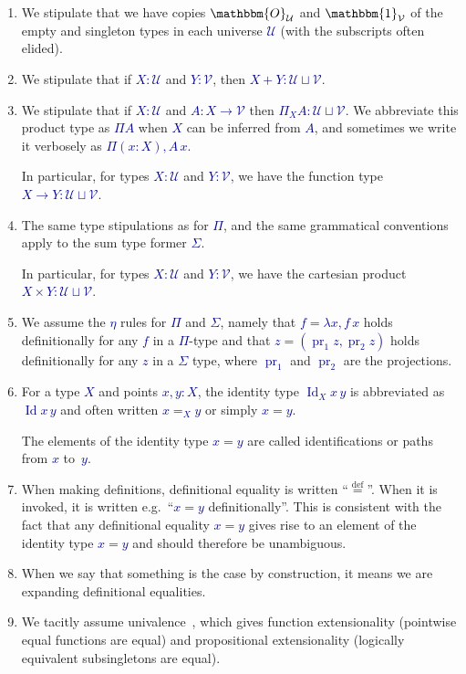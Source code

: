 \documentclass[10pt]{article}
\newcommand{\db}{\textcolor{darkblue}}
\newcommand{\m}[1]{\db{$#1$}}
\newcommand{\fst}{\operatorname{pr}_1}
\newcommand{\snd}{\operatorname{pr}_2}
\newcommand{\U}{\mathcal{U}}
\newcommand{\V}{\mathcal{V}}
\newcommand{\Zero}{\mathbbm{O}}
\newcommand{\One}{\mathbbm{1}}
\newcommand{\Id}{\operatorname{Id}}
\newcommand{\eqdef}{\overset{\text{def}}{=}}
\newcommand{\idto}{=}
\theoremstyle{definition}
\begin{document}
\begin{enumerate}
\item We stipulate that we have copies \m{\Zero_\U} and \m{\One_\V} of the
  empty and singleton types in each universe \m{\U} (with the subscripts
  often elided).
\item We stipulate that if \m{X : \U} and \m{Y : \V}, then \m{X+Y : \U \sqcup \V}.
\item We stipulate that if \m{X : \U} and \m{A : X \to \V} then
  \m{\Pi_X A : \U \sqcup \V}. We abbreviate this product type as \m{\Pi A}
  when \m{X} can be inferred from \m{A}, and sometimes we write it
  verbosely as \m{\Pi (x:X), A \, x}.

  In particular, for types \m{X : \U} and \m{Y : \V}, we have the function
  type \m{X \to Y : \U \sqcup \V}.
\item The same type stipulations as for \m{\Pi}, and the same
  grammatical conventions apply to the sum type former \m{\Sigma}.

  In particular, for types \m{X : \U} and \m{Y : \V}, we have the cartesian product \m{X \times Y : \U \sqcup \V}.

\item We assume the \m{\eta} rules for \m{\Pi} and \m{\Sigma}, namely
  that \m{f = \lambda x, f \, x} holds definitionally for any \m{f} in
  a \m{\Pi}-type and that \m{z=(\fst z , \snd z)} holds definitionally
  for any \m{z} in a \m{\Sigma} type, where \m{\fst} and \m{\snd} are
  the projections.

\item For a type \m{X} and points \m{x,y:X}, the identity type \m{\Id_{X} x \, y} is abbreviated as \m{\Id x \, y} and often written \m{x \idto_X y} or simply \m{x \idto y}.

  The elements of the identity type \m{x=y} are called identifications
  or paths from \m{x} to~\m{y}.

\item When making definitions, definitional equality is written ``$\eqdef$''. When it is invoked, it is written e.g.\ ``\m{x = y} definitionally''. This is consistent with the fact that any definitional equality \m{x = y} gives rise to an element of the identity type \m{x = y} and should therefore be unambiguous.

\item When we say that something is the case by construction, it means we
  are expanding definitional equalities.

\item We tacitly assume univalence~\cite{hottbook}, which gives
  function extensionality (pointwise equal functions are equal) and
  propositional extensionality (logically equivalent subsingletons are
  equal).


\end{enumerate}
\end{document}

